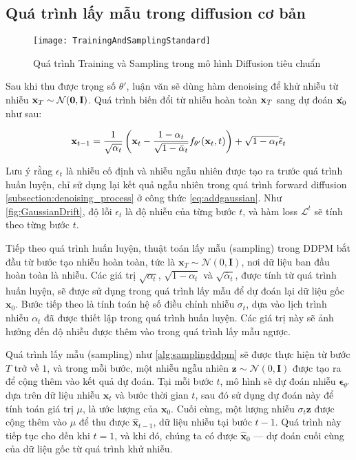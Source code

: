 \subsection{Quá trình lấy mẫu trong diffusion cơ bản}
	
		\begin{figure*}
		\centering
		\texttt{[image: TrainingAndSamplingStandard]}
		\caption{Quá trình Training và Sampling trong mô hình Diffusion tiêu chuẩn}
		\label{fig:GaussianDrift}
	\end{figure*}
	

	Sau khi thu được trọng số $\theta'$, luận văn sẽ dùng hàm denoising để khử nhiễu từ nhiễu $\mathbf{x}_T \sim \mathcal{N} (\mathbf{0}, \mathbf{I})$.
	Quá trình biến đổi từ nhiễu hoàn toàn $\mathbf{x}_{T}$ sang dự đoán $\hat{\mathbf{x}_0}$ như sau:
	
	\begin{equation}
		\label{eq:adddenoising}
	\mathbf{x}_{t-1} = \frac{1}{\sqrt{\alpha_t}} \left( \mathbf{x}_t - \frac{1- \alpha_t}{\sqrt{1 - \bar{\alpha}_t}} f_{\theta'}(\mathbf{x}_t, t) \right) + \sqrt{1 - \alpha_t} \tilde{\epsilon}_t
	\end{equation}
	
Lưu ý rằng $\epsilon_t$ là nhiễu cố định và nhiễu ngẫu nhiên được tạo ra trước quá trình huấn luyện, chỉ sử dụng lại kết quả ngẫu nhiên trong quá trình forward diffusion \autoref{subsection:denoising_process} ở công thức  \autoref{eq:addgaussian}. Như \autoref{fig:GaussianDrift}, độ lỗi $\epsilon_t$ là độ nhiễu của từng bước $t$, và hàm loss  $\mathcal{L}^{t}$ sẽ tính theo từng bước $t$.


Tiếp theo quá trình huấn luyện, thuật toán lấy mẫu (sampling) trong DDPM bắt đầu từ bước tạo nhiễu hoàn toàn, tức là $\mathbf{x}_T \sim \mathcal{N}(0, \mathbf{I})$, nơi dữ liệu ban đầu hoàn toàn là nhiễu. Các giá trị $\sqrt{\alpha_t}$, $\sqrt{1 - \alpha_t}$ và $\sqrt{\bar{\alpha}_t}$, được tính từ quá trình huấn luyện, sẽ được sử dụng trong quá trình lấy mẫu để dự đoán lại dữ liệu gốc $\mathbf{x}_0$. Bước tiếp theo là tính toán hệ số điều chỉnh nhiễu $\sigma_t$, dựa vào lịch trình nhiễu $\alpha_t$ đã được thiết lập trong quá trình huấn luyện. Các giá trị này sẽ ảnh hưởng đến độ nhiễu được thêm vào trong quá trình lấy mẫu ngược.

Quá trình lấy mẫu (sampling) như \autoref{alg:samplingddpm} sẽ được thực hiện từ bước $T$ trở về $1$, và trong mỗi bước, một nhiễu ngẫu nhiên $\mathbf{z} \sim \mathcal{N}(0, \mathbf{I})$ được tạo ra để cộng thêm vào kết quả dự đoán. Tại mỗi bước $t$, mô hình sẽ dự đoán nhiễu $\boldsymbol{\epsilon}_{\theta'}$ dựa trên dữ liệu nhiễu $\mathbf{x}_t$ và bước thời gian $t$, sau đó sử dụng dự đoán này để tính toán giá trị $\mu$, là ước lượng của $\mathbf{x}_0$. Cuối cùng, một lượng nhiễu $\sigma_t \mathbf{z}$ được cộng thêm vào $\mu$ để thu được $\hat{\mathbf{x}}_{t-1}$, dữ liệu nhiễu tại bước $t-1$. Quá trình này tiếp tục cho đến khi $t = 1$, và khi đó, chúng ta có được $\hat{\mathbf{x}}_0$ — dự đoán cuối cùng của dữ liệu gốc từ quá trình khử nhiễu.

